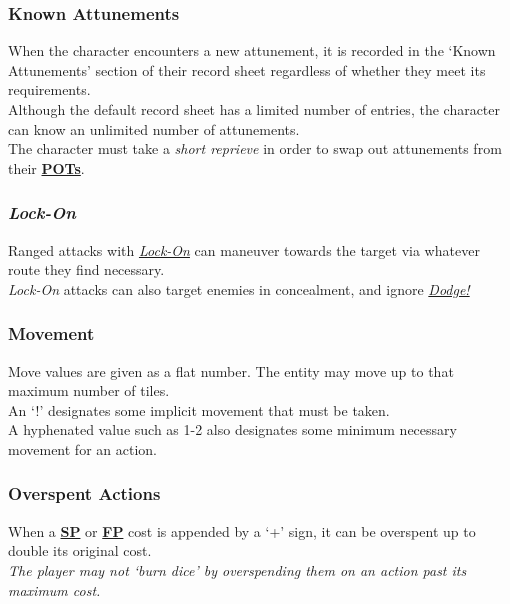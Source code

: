 \documentclass[12pt]{article}
\newcommand{\refto}[1]{\hyperlink{#1}{\textbf{#1}}}
\newcommand{\reftoit}[1]{\hyperlink{#1}{\emph{#1}}}
\begin{document}
\begin{multicols*}{2}
\subsubsection{Known Attunements}
When the character encounters a new attunement, it is recorded in the ‘Known Attunements’ section of their record sheet regardless of whether they meet its requirements.\\
Although the default record sheet has a limited number of entries, the character can know an unlimited number of attunements.\\
The character must take a \emph{short reprieve} in order to swap out attunements from their \refto{POTs}.

\subsubsection{\emph{Lock-On}}
\hypertarget{Lock-On}{}
Ranged attacks with \reftoit{Lock-On} can maneuver towards the target via whatever route they find necessary.\\
\emph{Lock-On} attacks can also target enemies in concealment, and ignore \reftoit{Dodge!}

\subsubsection{Movement}
Move values are given as a flat number. The entity may move up to that maximum number of tiles.\\
An ‘!’ designates some implicit movement that must be taken.\\
A hyphenated value such as 1-2 also designates some minimum necessary movement for an action.

\subsubsection{Overspent Actions}
When a \refto{SP} or \refto{FP} cost is appended by a ‘+’ sign, it can be overspent up to double its original cost.\\
\emph{The player may not ‘burn dice’ by overspending them on an action past its maximum cost.}


\end{multicols*}
\end{document}
